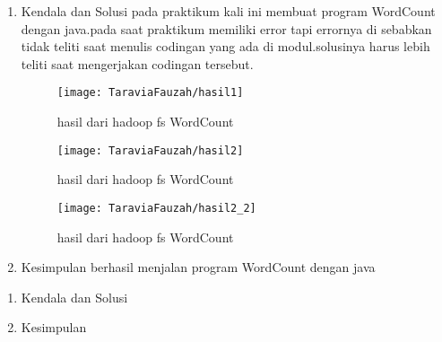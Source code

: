\begin{enumerate}
\item Kendala dan Solusi
\newline pada praktikum kali ini membuat program WordCount dengan java.pada saat praktikum memiliki error tapi errornya di sebabkan tidak teliti saat menulis codingan yang ada di modul.solusinya harus lebih teliti saat mengerjakan codingan tersebut.

\begin{figure}[!ht]
\texttt{[image: TaraviaFauzah/hasil1]}
\caption{hasil dari hadoop fs WordCount}
\label{gam:perkuliahan2-12}
\end{figure}

\begin{figure}[!ht]
\texttt{[image: TaraviaFauzah/hasil2]}
\caption{hasil dari hadoop fs WordCount}
\label{gam:perkuliahan2-12}
\end{figure}

\begin{figure}[!ht]
\texttt{[image: TaraviaFauzah/hasil2\_2]}
\caption{hasil dari hadoop fs WordCount}
\label{gam:perkuliahan2-12}
\end{figure}

\item Kesimpulan
\newline berhasil menjalan program WordCount dengan java

\end{enumerate}

\begin{enumerate}
\item Kendala dan Solusi

\item Kesimpulan

\end{enumerate}